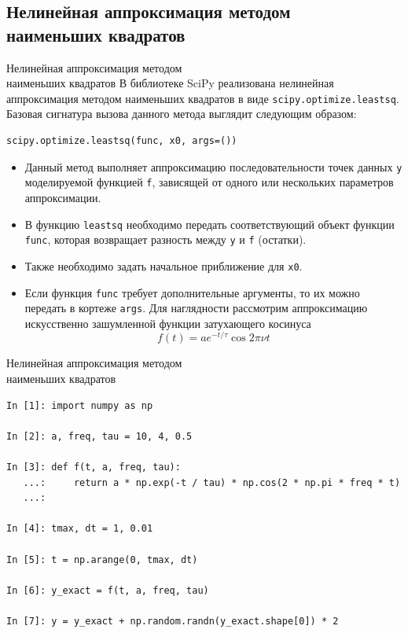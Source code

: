 \documentclass[aspectratio=169, mathserif]{beamer}	%
\begin{document}
\subsection{Нелинейная аппроксимация методом \\ наименьших квадратов}
\begin{frame}[fragile]{Нелинейная аппроксимация методом \\ наименьших квадратов}
\scriptsize
В библиотеке SciPy реализована нелинейная аппроксимация методом наименьших квадратов в виде  \texttt{scipy.optimize.leastsq}. Базовая сигнатура вызова данного метода выглядит следующим образом:

\begin{lstlisting}[language=iPython, numbers=none, frame=none ]
scipy.optimize.leastsq(func, x0, args=())
\end{lstlisting}

\begin{itemize}
	\item Данный метод выполняет аппроксимацию последовательности точек данных \texttt{y} моделируемой функцией \texttt{f}, зависящей от одного или нескольких параметров аппроксимации. 
	\item В функцию \texttt{leastsq} необходимо передать соответствующий объект функции \texttt{func}, которая возвращает разность между \texttt{y} и \texttt{f} (остатки). 
	\item Также необходимо задать начальное приближение для \texttt{x0}. 
	\item Если функция \texttt{func} требует дополнительные аргументы, то их можно передать в кортеже \texttt{args}. 
	Для наглядности рассмотрим аппроксимацию искусственно зашумленной функции затухающего косинуса 
	$$ f(t) = ae^{-t/\tau}\cos2\pi\nu t $$
\end{itemize}

\vfil
\end{frame}

\begin{frame}[fragile]{Нелинейная аппроксимация методом \\ наименьших квадратов}
\scriptsize
\begin{lstlisting}[language=iPython, numbers=none,  frame=none, ]
In [1]: import numpy as np

In [2]: a, freq, tau = 10, 4, 0.5

In [3]: def f(t, a, freq, tau):
   ...:     return a * np.exp(-t / tau) * np.cos(2 * np.pi * freq * t)
   ...:

In [4]: tmax, dt = 1, 0.01

In [5]: t = np.arange(0, tmax, dt)

In [6]: y_exact = f(t, a, freq, tau)

In [7]: y = y_exact + np.random.randn(y_exact.shape[0]) * 2
\end{lstlisting}
\vfill
\end{frame}
\end{document}

